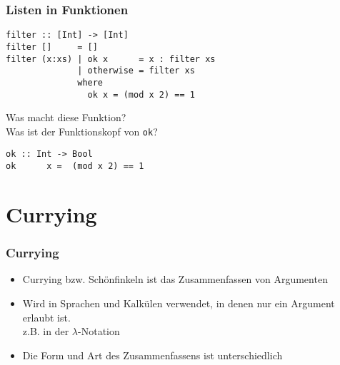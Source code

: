 \documentclass[fleqn,11pt,aspectratio=43]{beamer}
\begin{document}
\begin{frame}[fragile]
\frametitle{Listen in Funktionen}
\begin{lstlisting}
filter :: [Int] -> [Int]
filter []     = []
filter (x:xs) | ok x      = x : filter xs
              | otherwise = filter xs
              where
                ok x = (mod x 2) == 1
\end{lstlisting}
\vspace*{-1ex}
\begin{block}{\vspace*{-2ex}}
Was macht diese Funktion?\\
Was ist der Funktionskopf von \lstinline|ok|?\\
\end{block}
\pause
\begin{lstlisting}
ok :: Int -> Bool
ok      x =  (mod x 2) == 1
\end{lstlisting}
\end{frame}

\section{Currying~}

\begin{frame}
\frametitle{Currying}
\begin{block}{\vspace*{-3ex}}
\begin{itemize}
  \item Currying bzw. Schönfinkeln ist das Zusammenfassen von Argumenten
  \item Wird in Sprachen und Kalkülen verwendet, in denen nur ein Argument erlaubt ist.\\
  		z.B. in der $\lambda$-Notation
  \item Die Form und Art des Zusammenfassens ist unterschiedlich 
\end{itemize}
\end{block}
\end{frame}
\end{document}
